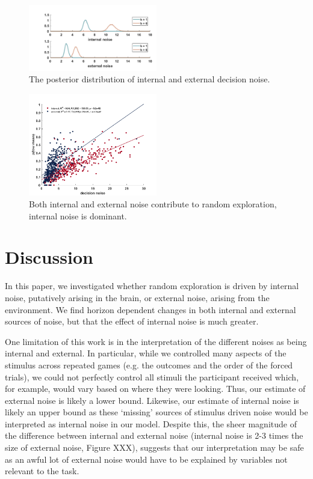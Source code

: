 \documentclass[12pt]{article}
\begin{document}
	\begin{figure}[H]
		\begin{center}
			\includegraphics[width=0.5\textwidth]{figures/bayesdist.png}
			\caption{The posterior distribution of internal and external decision noise.}
			\label{fig:modelbased}
		\end{center}
	\end{figure}
	
	\begin{figure}[H]
		\begin{center}
			\includegraphics[width=0.5\textwidth]{figures/s1.png}
			\caption{Both internal and external noise contribute to random exploration, internal noise is dominant.}
			\label{fig:modelbased}
		\end{center}
	\end{figure}

	\section*{Discussion}
	In this paper, we investigated whether random exploration is driven by internal noise, putatively arising in the brain, or external noise, arising from the environment.  We find horizon dependent changes in both internal and external sources of noise, but that the effect of internal noise is much greater. 
	
	One limitation of this work is in the interpretation of the different noises as being internal and external. In particular, while we controlled many aspects of the stimulus across repeated games (e.g. the outcomes and the order of the forced trials), we could not perfectly control all stimuli the participant received which, for example, would vary based on where they were looking. Thus, our estimate of external noise is likely a lower bound. Likewise, our estimate of internal noise is likely an upper bound as these `missing' sources of stimulus driven noise would be interpreted as internal noise in our model. Despite this, the sheer magnitude of the difference between internal and external noise (internal noise is 2-3 times the size of external noise, Figure XXX), suggests that our interpretation may be safe as an awful lot of external noise would have to be explained by variables not relevant to the task.  
	
\end{document}
